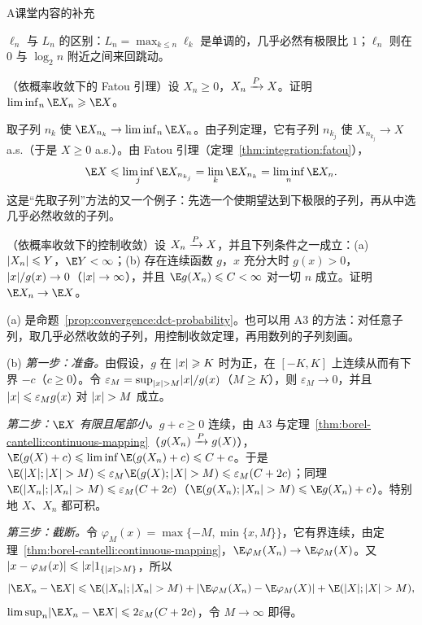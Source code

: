 \begin{exercises}{A}{课堂内容的补充}
\begin{solution}
$\ell_n$ 与 $L_n$ 的区别：$L_n=\max_{k\leqslant n}\ell_k$ 是单调的，几乎必然有极限比 $1$；$\ell_n$ 则在 $0$ 与 $\log_2n$ 附近之间来回跳动。
\end{solution}

\item\label{ex:borel-cantelli:A3} （依概率收敛下的 Fatou 引理）设 $X_n\geqslant0$，$X_n\toP X$。证明 $\liminf_n\E X_n\geqslant \E X$。
\begin{solution}
取子列 $n_k$ 使 $\E X_{n_k}\to\liminf_n\E X_n$。由子列定理，它有子列 $n_{k_j}$ 使 $X_{n_{k_j}}\to X$ a.s.（于是 $X\geqslant0$ a.s.）。由 Fatou 引理（定理~\ref{thm:integration:fatou}），
\[
\E X\leqslant\liminf_j\E X_{n_{k_j}}=\lim_k\E X_{n_k}=\liminf_n\E X_n .
\]
这是“先取子列”方法的又一个例子：先选一个使期望达到下极限的子列，再从中选几乎必然收敛的子列。
\end{solution}

\item\label{ex:borel-cantelli:A4} （依概率收敛下的控制收敛）设 $X_n\toP X$，并且下列条件之一成立：(a) $\abs{X_n}\leqslant Y$，$\E Y<\infty$；(b) 存在连续函数 $g$，$x$ 充分大时 $g(x)>0$，$\abs x/g(x)\to0$（$\abs x\to\infty$），并且 $\E g(X_n)\leqslant C<\infty$ 对一切 $n$ 成立。证明 $\E X_n\to \E X$。
\begin{solution}
(a) 是命题~\ref{prop:convergence:dct-probability}。也可以用 A3 的方法：对任意子列，取几乎必然收敛的子列，用控制收敛定理，再用数列的子列刻画。

(b) \emph{第一步：准备。}由假设，$g$ 在 $\abs x\geqslant K$ 时为正，在 $[-K,K]$ 上连续从而有下界 $-c$（$c\geqslant0$）。令 $\varepsilon_M=\sup_{\abs x>M}\abs x/g(x)$（$M\geqslant K$），则 $\varepsilon_M\to0$，并且 $\abs x\leqslant\varepsilon_Mg(x)$ 对 $\abs x>M$ 成立。

\emph{第二步：$\E X$ 有限且尾部小。}$g+c\geqslant0$ 连续，由 A3 与定理~\ref{thm:borel-cantelli:continuous-mapping}（$g(X_n)\toP g(X)$），$\E(g(X)+c)\leqslant\liminf \E(g(X_n)+c)\leqslant C+c$。于是 $\E(\abs X;\abs X>M)\leqslant\varepsilon_M\E(g(X);\abs X>M)\leqslant\varepsilon_M(C+2c)$；同理 $\E(\abs{X_n};\abs{X_n}>M)\leqslant\varepsilon_M(C+2c)$（$\E(g(X_n);\abs{X_n}>M)\leqslant \E g(X_n)+c$）。特别地 $X$、$X_n$ 都可积。

\emph{第三步：截断。}令 $\varphi_M(x)=\max\{-M,\min\{x,M\}\}$，它有界连续，由定理~\ref{thm:borel-cantelli:continuous-mapping}，$\E\varphi_M(X_n)\to \E\varphi_M(X)$。又 $\abs{x-\varphi_M(x)}\leqslant\abs x\one_{\{\abs x>M\}}$，所以
\[
\abs{\E X_n-\E X}\leqslant \E(\abs{X_n};\abs{X_n}>M)+\abs{\E\varphi_M(X_n)-\E\varphi_M(X)}+\E(\abs X;\abs X>M),
\]
$\limsup_n\abs{\E X_n-\E X}\leqslant2\varepsilon_M(C+2c)$，令 $M\to\infty$ 即得。


\end{solution}
\end{exercises}
